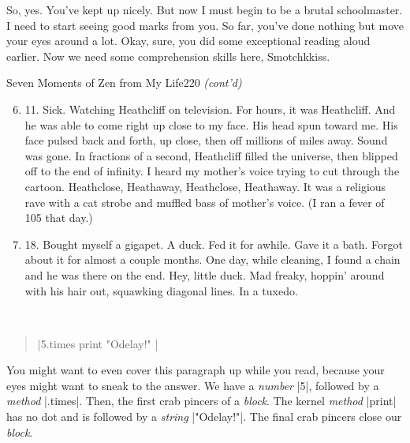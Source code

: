 \documentclass[12pt,twoside]{report}
\begin{document}
So, yes.  You've kept up nicely.  But now I must begin to be a brutal
schoolmaster. I need to start seeing good marks from you.  So far,
you've done nothing but move your eyes around a lot.  Okay, sure, you
did some exceptional reading aloud earlier.  Now we need some
comprehension skills here, Smotchkkiss.

	\begin{sidebar}{Seven Moments of Zen from My Life}{220}
		\textit{(cont'd)}
		\begin{flushleft}
		\begin{enumerate}
			\setcounter{enumi}{5}
			\item 11. Sick. Watching Heathcliff on television. For hours, it was Heathcliff. And he was able to come right up close to my face. His head spun toward me. His face pulsed back and forth, up close, then off millions of miles away. Sound was gone. In fractions of a second, Heathcliff filled the universe, then blipped off to the end of infinity. I heard my mother's voice trying to cut through the cartoon. Heathclose, Heathaway, Heathclose, Heathaway. It was a religious rave with a cat strobe and muffled bass of mother's voice. (I ran a fever of 105 that day.)
			\item 18. Bought myself a gigapet. A duck. Fed it for awhile. Gave it a bath. Forgot about it for almost a couple months. One day, while cleaning, I found a chain and he was there on the end. Hey, little duck. Mad freaky, hoppin' around with his hair out, squawking diagonal lines. In a tuxedo.
		\end{enumerate}
		\end{flushleft}
		\vspace{6pt}
	\end{sidebar}

\ 

\begin{quote}
\rubyinline|5.times { print "Odelay!" }|\end{quote}


You might want to even cover this paragraph up while you read, because
your eyes might want to sneak to the answer.  We have a {\em number}
\rubyinline|5|, followed by a {\em method}
\rubyinline|.times|.  Then, the first crab pincers of
a {\em block}.  The kernel {\em method}
\rubyinline|print| has no dot and is followed by a
	   {\em string} \rubyinline|"Odelay!"|.  The
	   final crab pincers close our {\em block}.

\bigskip \bigskip \bigskip
\end{document}
